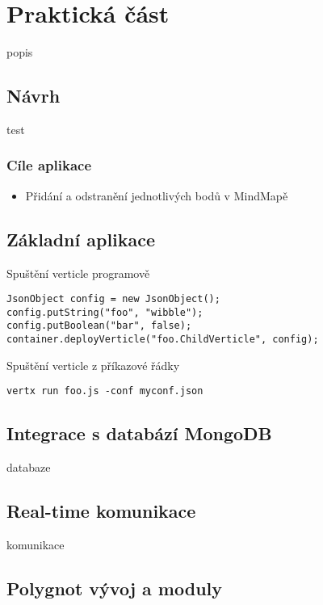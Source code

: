 
\chapter{Praktická část}

popis

\section{Návrh}

test

\subsection{Cíle aplikace}

\begin{itemize}
\item Přidání a odstranění jednotlivých bodů v MindMapě
\end{itemize}

\section{Základní aplikace}

Spuštění verticle programově
\begin{lstlisting}
JsonObject config = new JsonObject();
config.putString("foo", "wibble");
config.putBoolean("bar", false);
container.deployVerticle("foo.ChildVerticle", config);
\end{lstlisting}

Spuštění verticle z příkazové řádky
\begin{lstlisting}
vertx run foo.js -conf myconf.json
\end{lstlisting}

\section{Integrace s databází MongoDB}

databaze

\section{Real-time komunikace}\label{sec:realTimeCommunication}

komunikace

\section{Polygnot vývoj a moduly}

